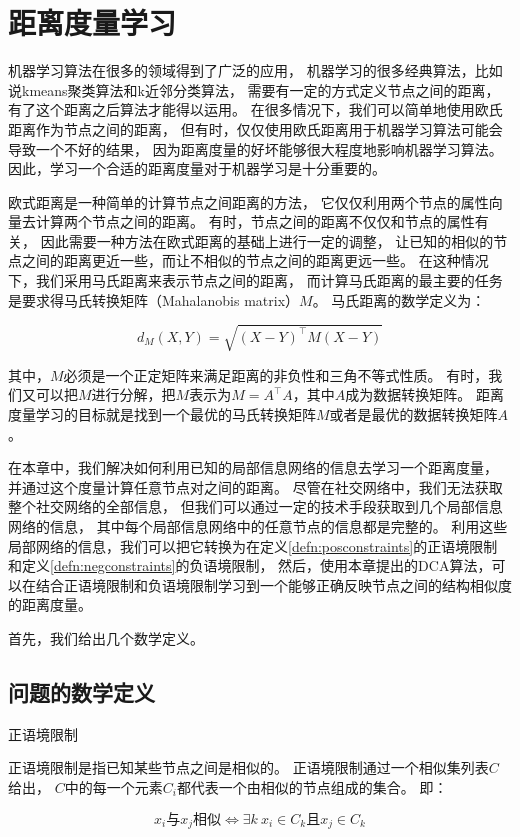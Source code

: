 \chapter{距离度量学习}
\label{chap:dca}


机器学习算法在很多的领域得到了广泛的应用，
机器学习的很多经典算法，比如说kmeans聚类算法和k近邻分类算法，
需要有一定的方式定义节点之间的距离，有了这个距离之后算法才能得以运用。
在很多情况下，我们可以简单地使用欧氏距离作为节点之间的距离，
但有时，仅仅使用欧氏距离用于机器学习算法可能会导致一个不好的结果，
因为距离度量的好坏能够很大程度地影响机器学习算法。
因此，学习一个合适的距离度量对于机器学习是十分重要的。

欧式距离是一种简单的计算节点之间距离的方法，
它仅仅利用两个节点的属性向量去计算两个节点之间的距离。
有时，节点之间的距离不仅仅和节点的属性有关，
因此需要一种方法在欧式距离的基础上进行一定的调整，
让已知的相似的节点之间的距离更近一些，而让不相似的节点之间的距离更远一些。
在这种情况下，我们采用马氏距离来表示节点之间的距离，
而计算马氏距离的最主要的任务是要求得马氏转换矩阵（Mahalanobis matrix）$M$。
马氏距离的数学定义为：

\begin{equation}
    d_M(X, Y) = \sqrt{(X - Y)^\top M (X - Y)}
\end{equation}

其中，$M$必须是一个正定矩阵来满足距离的非负性和三角不等式性质。
有时，我们又可以把$M$进行分解，把$M$表示为$M = A^\top A$，其中$A$成为数据转换矩阵。
距离度量学习的目标就是找到一个最优的马氏转换矩阵$M$或者是最优的数据转换矩阵$A$。

在本章中，我们解决如何利用已知的局部信息网络的信息去学习一个距离度量，
并通过这个度量计算任意节点对之间的距离。
尽管在社交网络中，我们无法获取整个社交网络的全部信息，
但我们可以通过一定的技术手段获取到几个局部信息网络的信息，
其中每个局部信息网络中的任意节点的信息都是完整的。
利用这些局部网络的信息，我们可以把它转换为在定义\ref{defn:posconstraints}的正语境限制
和定义\ref{defn:negconstraints}的负语境限制，
然后，使用本章提出的DCA算法，可以在结合正语境限制和负语境限制学习到一个能够正确反映节点之间的结构相似度的距离度量。

首先，我们给出几个数学定义。

\section{问题的数学定义}
\label{sec:dcadef}

\begin{defn}{正语境限制}
\label{defn:posconstraints}

    正语境限制是指已知某些节点之间是相似的。
    正语境限制通过一个相似集列表$C$给出，
    $C$中的每一个元素$C_i$都代表一个由相似的节点组成的集合。
    即：

    $$
    x_i\text{与}x_j\text{相似} \Longleftrightarrow \exists k \ x_i \in C_k \text{且} x_j \in C_k 
    $$

\end{defn}

